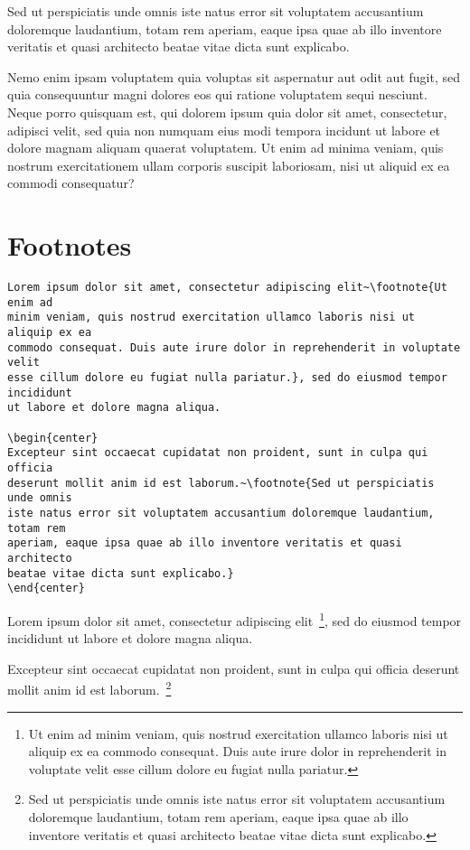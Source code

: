 \begin{flushright}
Sed ut perspiciatis unde omnis iste natus error sit voluptatem accusantium
doloremque laudantium, totam rem aperiam, eaque ipsa quae ab illo inventore
veritatis et quasi architecto beatae vitae dicta sunt explicabo.
\end{flushright}

Nemo enim ipsam voluptatem quia voluptas sit aspernatur aut odit aut fugit,
sed quia consequuntur magni dolores eos qui ratione voluptatem sequi nesciunt.
\ccpar{}
Neque porro quisquam est, qui dolorem ipsum quia dolor sit amet, consectetur,
adipisci velit, sed quia non numquam eius modi tempora incidunt ut labore et
dolore magnam aliquam quaerat voluptatem.
\ccpar{}
Ut enim ad minima veniam, quis nostrum exercitationem ullam corporis suscipit
laboriosam, nisi ut aliquid ex ea commodi consequatur?

\section*{Footnotes}
\label{sec:footnotes}

\begin{lstlisting}[caption={Some footnotes.}]
Lorem ipsum dolor sit amet, consectetur adipiscing elit~\footnote{Ut enim ad
minim veniam, quis nostrud exercitation ullamco laboris nisi ut aliquip ex ea
commodo consequat. Duis aute irure dolor in reprehenderit in voluptate velit
esse cillum dolore eu fugiat nulla pariatur.}, sed do eiusmod tempor incididunt
ut labore et dolore magna aliqua.

\begin{center}
Excepteur sint occaecat cupidatat non proident, sunt in culpa qui officia
deserunt mollit anim id est laborum.~\footnote{Sed ut perspiciatis unde omnis
iste natus error sit voluptatem accusantium doloremque laudantium, totam rem
aperiam, eaque ipsa quae ab illo inventore veritatis et quasi architecto
beatae vitae dicta sunt explicabo.}
\end{center}
\end{lstlisting}

Lorem ipsum dolor sit amet, consectetur adipiscing elit~\footnote{Ut enim ad
minim veniam, quis nostrud exercitation ullamco laboris nisi ut aliquip ex ea
commodo consequat. Duis aute irure dolor in reprehenderit in voluptate velit
esse cillum dolore eu fugiat nulla pariatur.}, sed do eiusmod tempor incididunt
ut labore et dolore magna aliqua.

\begin{center}
Excepteur sint occaecat cupidatat non proident, sunt in culpa qui officia
deserunt mollit anim id est laborum.~\footnote{Sed ut perspiciatis unde omnis
iste natus error sit voluptatem accusantium doloremque laudantium, totam rem
aperiam, eaque ipsa quae ab illo inventore veritatis et quasi architecto
beatae vitae dicta sunt explicabo.}
\end{center}

